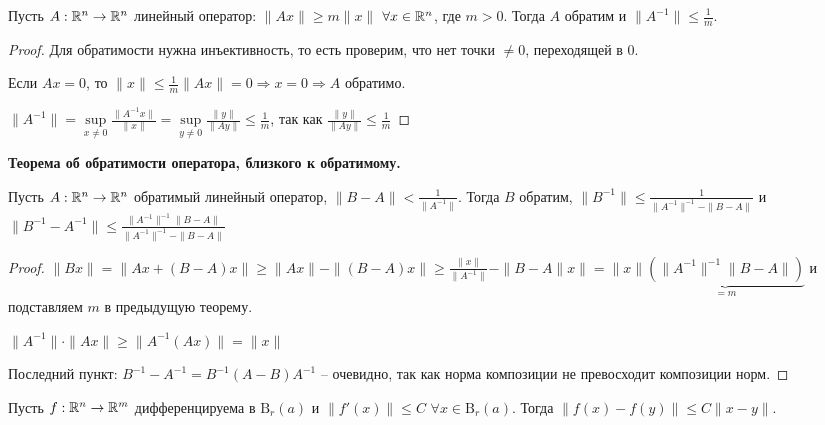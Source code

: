 \begin{theorem}
    Пусть $A:\mathbb{R}^n \rightarrow \mathbb{R}^n$ линейный оператор: $\|Ax\|\geq m\|x\|$ $\forall x\in \mathbb{R}^n$, где $m>0$. Тогда $A$ обратим и $\|A^{-1}\|\leq \frac{1}{m}$.
\end{theorem}

\begin{proof}
    Для обратимости нужна инъективность, то есть проверим, что нет точки $\neq 0$, переходящей в $0$.

    Если $Ax=0$, то $\|x\|\leq \frac{1}{m}\|Ax\|=0\Rightarrow x=0\Rightarrow A$ обратимо.

    $\|A^{-1}\|=\sup\limits_{x\neq 0}\frac{\|A^{-1}x\|}{\|x\|}=\sup\limits_{y\neq 0}\frac{\|y\|}{\|Ay\|}\leq \frac{1}{m}$, так как $\frac{\|y\|}{\|Ay\|}\leq \frac{1}{m}$
\end{proof}

\begin{theorem}
    \textbf{Теорема об обратимости оператора, близкого к обратимому.}

    Пусть $A:\mathbb{R}^n\rightarrow \mathbb{R}^n$ обратимый линейный оператор, $\|B-A\|<\frac{1}{\|A^{-1}\|}$. Тогда $B$ обратим, $\|B^{-1}\|\leq \frac{1}{\|A^{-1}\|^{-1}-\|B-A\|}$ и $\|B^{-1}-A^{-1}\|\leq \frac{\|A^{-1}\|^{-1}\|B-A\|}{\|A^{-1}\|^{-1}-\|B-A\|}$
\end{theorem}

\begin{proof}
    $\|Bx\|=\|Ax+(B-A)x\|\geq \|Ax\|-\|(B-A)x\| \geq \frac{\|x\|}{\|A^{-1}\|}-\|B-A\|x\|=\|x\|\underbrace{(\|A^{-1}\|^{-1}\|B-A\|)}_{=m}$ и подставляем $m$ в предыдущую теорему.

    $\|A^{-1}\|\cdot \|Ax\|\geq \|A^{-1}(Ax)\|=\|x\|$

    Последний пункт: $B^{-1}-A^{-1}=B^{-1}(A-B)A^{-1}$ – очевидно, так как норма композиции не превосходит композиции норм. 
\end{proof}

\begin{theorem}
    Пусть $f:\mathbb{R}^n\rightarrow \mathbb{R}^m$ дифференцируема в $\text{B}_r(a)$ и $\|f'(x)\|\leq C$ $\forall x\in \text{B}_r(a)$. Тогда $\|f(x) - f(y)\|\leq C\|x - y\|$.
\end{theorem}

